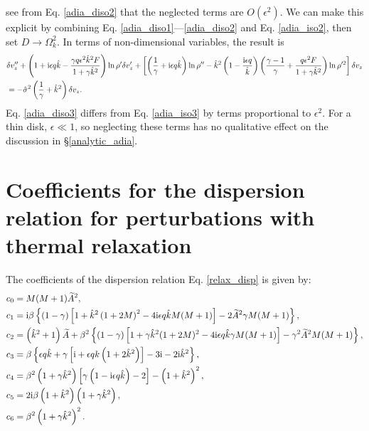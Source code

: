 see from Eq. \ref{adia_diso2} that the neglected terms are
$O(\epsilon^2)$. We can make this explicit by combining
Eq. \ref{adia_diso1}---\ref{adia_diso2} and Eq. \ref{adia_iso2}, then
set $D\to\Omega_k^2$. In terms of non-dimensional variables, the result
is  
\begin{align}
   &\delta v_z ^{\prime\prime} + \left(1 + \mathrm{i}\epsilon q\hat{k} -
    \frac{\gamma q \epsilon^2\hat{k}^2F}{1+\gamma
      \hat{k}^2}\right)\ln\rho^{\prime}\delta v_z^\prime +
  \left[\left(\frac{1}{\gamma} + \mathrm{i} \epsilon q
      \hat{k}\right)\ln\rho^{\prime\prime} - \hat{k}^2\left(1 -
      \frac{\mathrm{i}\epsilon
        q}{\hat{k}}\right)\left(\frac{\gamma-1}{\gamma} +
      \frac{q\epsilon^2F}{1+\gamma\hat{k}^2}\right)\ln\rho^{\prime
      2}\right]\delta v_z \notag\\&=
  -\hat{\sigma}^2\left(\frac{1}{\gamma} + \hat{k}^2\right)\delta v_z\label{adia_diso3}.
\end{align}   
Eq. \ref{adia_diso3} differs from Eq. \ref{adia_iso3} by terms
proportional to $\epsilon^2$. For a thin disk, $\epsilon\ll1$, so
neglecting these terms has no qualitative effect on the discussion in
\S\ref{analytic_adia}. 

\section{Coefficients for the dispersion relation for perturbations
with thermal relaxation}\label{relax_coeff}
The coefficients of the dispersion relation Eq. \ref{relax_disp} is
given by:
\begin{align}
  &c_0 = M(M+1)\widetilde{A}^2,\\
  &c_1 = \mathrm{i}\beta\left\{\left(1-\gamma\right)\left[1 +
      \hat{k}^2\left(1+2M\right)^2 - 4 \mathrm{i}\epsilon q\hat{k} M (M+1)\right] 
    - 2\widetilde{A}^2\gamma M (M+1)\right\},\\
  &c_2 = \left(\hat{k}^2 + 1\right)\widetilde{A} + \beta^2\left\{(1-\gamma)\left[1
      + \gamma \hat{k}^2(1+2M)^2 - 4\mathrm{i}\epsilon q \hat{k} \gamma M(M+1)
    \right]
    -\gamma^2 \widetilde{A}^2 M(M+1)
  \right\},\\
  &c_3 = \beta\left\{\epsilon q \hat{k} + \gamma \left[\mathrm{i} + \epsilon q
      k \left(1+2\hat{k}^2\right)\right] - 3\mathrm{i} - 2\mathrm{i}
    \hat{k}^2\right\},\\
  &c_4 =
  \beta^2\left(1+\gamma\hat{k}^2\right)\left[\gamma\left(1-\mathrm{i}\epsilon q
    \hat{k}\right)-2\right] - \left(1+\hat{k}^2\right)^2,\\
&c_5 = 2\mathrm{i}\beta\left(1+\hat{k}^2\right)\left(1+\gamma\hat{k}^2\right),\\
&c_6 = \beta^2\left(1+\gamma\hat{k}^2\right)^2.
\end{align}